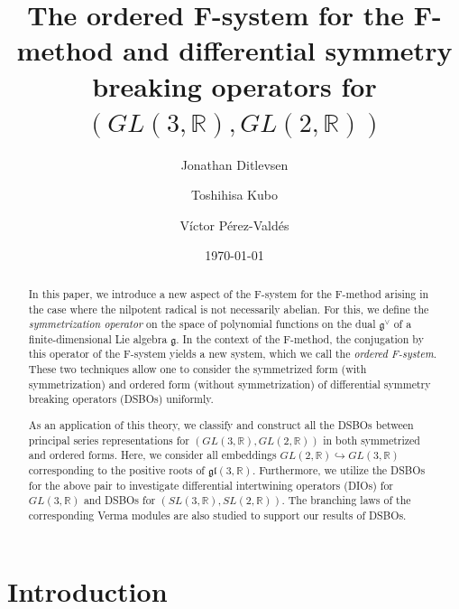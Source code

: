 \documentclass[a4paper,11pt,reqno]{amsart}
\title[differential symmetry breaking operators]{The ordered F-system for the F-method and differential symmetry breaking operators for $(GL(3,\mathbb{R}), GL(2,\mathbb{R}))$ }
\author{Jonathan Ditlevsen}
\author{Toshihisa Kubo}
\author{V{\' i}ctor P{\'e}rez-Vald{\'e}s}
\newcommand{\frakg}{\mathfrak{g}}
\newcommand{\0}{{\bf 0}}
\newcommand{\R}{\mathbb{R}}
\newcommand{\1}{{\bf 1}}
\theoremstyle{plain}
\theoremstyle{definition}
\numberwithin{equation}{section}
\theoremstyle{definition}
\begin{document}


\date{\today}

\begin{abstract} 
In this paper, we introduce a new aspect of the F-system for the F-method arising in the case where the nilpotent radical is not necessarily abelian.
For this, we define the \emph{symmetrization operator}
on the space of polynomial functions on the dual $\frakg^\vee$ 
of a finite-dimensional Lie algebra $\frakg$. 
In the context of the F-method,
the conjugation by this operator 
of the F-system yields 
a new system, which we call the \emph{ordered F-system}.
These two techniques allow one to consider the symmetrized form 
(with symmetrization) and ordered form (without symmetrization) of differential symmetry breaking operators (DSBOs) uniformly. 

As an application of this theory,
we classify and construct all the DSBOs 
between principal series representations
for $(GL(3,\R), GL(2,\R))$ in both symmetrized and ordered forms.
Here, we consider all embeddings $GL(2,\R) \hookrightarrow GL(3,\R)$ 
corresponding to the positive roots of $\mathfrak{gl}(3,\R)$. Furthermore, we utilize the DSBOs for the above pair to investigate differential intertwining operators (DIOs) for $GL(3,\R)$ and DSBOs for $(SL(3,\R), SL(2,\R))$. The branching laws of the corresponding Verma modules are also studied to support our results of DSBOs.
\end{abstract}


\maketitle

\setcounter{tocdepth}{1}
\tableofcontents


\section{Introduction}
\end{document}
